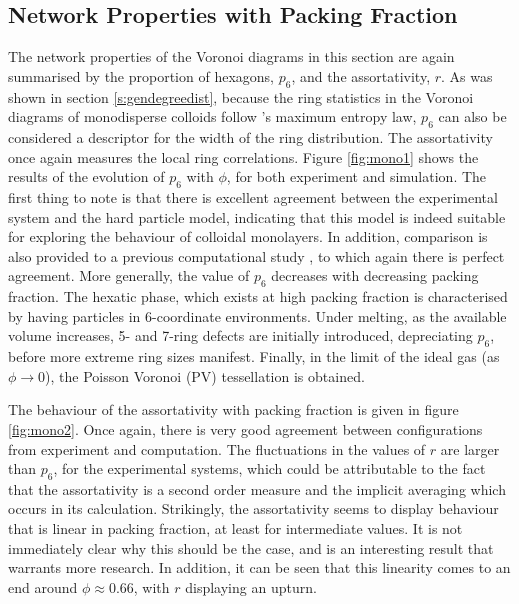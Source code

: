 \subsection{Network Properties with Packing Fraction}

The network properties of the Voronoi diagrams in this section are again summarised by the proportion of hexagons, $p_6$, and the assortativity, $r$.
As was shown in section \ref{s:gendegreedist}, because the ring statistics in the Voronoi diagrams of monodisperse \qtd{} colloids follow \lm's maximum entropy law, $p_6$ can also be considered a descriptor for the width of the ring distribution.
The assortativity once again measures the local ring correlations.
Figure \ref{fig:mono1} shows the results of the evolution of $p_6$ with $\phi$, for both experiment and simulation.
The first thing to note is that there is excellent agreement between the experimental system and the hard particle model, indicating that this model is indeed suitable for exploring the behaviour of colloidal monolayers.
In addition, comparison is also provided to a previous computational study \cite{Kumar2005}, to which again there is perfect agreement.
More generally, the value of $p_6$ decreases with decreasing packing fraction.
The hexatic phase, which exists at high packing fraction is characterised by having particles in 6\--coordinate environments.
Under melting, as the available volume increases, 5\-- and 7\--ring defects are initially introduced, depreciating $p_6$, before more extreme ring sizes manifest.
Finally, in the limit of the ideal gas (as $\phi\rightarrow 0$), the Poisson Voronoi (PV) tessellation is obtained.

The behaviour of the assortativity with packing fraction is given in figure \ref{fig:mono2}.
Once again, there is very good agreement between configurations from experiment and computation.
The fluctuations in the values of $r$ are larger than $p_6$, for the experimental systems, which could be attributable to the fact that the assortativity is a second order measure and the implicit averaging which occurs in its calculation.
Strikingly, the assortativity seems to display behaviour that is linear in packing fraction, at least for intermediate values.
It is not immediately clear why this should be the case, and is an interesting result that warrants more research.
In addition, it can be seen that this linearity comes to an end around $\phi\approx 0.66$, with $r$ displaying an upturn.

